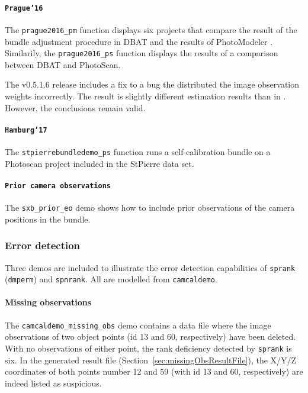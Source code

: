 \documentclass{article}
\begin{document}
\paragraph{\texttt{Prague'16}}
\label{sec:orgfb80e75}
The \texttt{prague2016\_pm} function displays six projects that
compare the result of the bundle adjustment procedure in DBAT and the
results of PhotoModeler \citep{Borlin2016:External}. Similarily, the
\texttt{prague2016\_ps} function displays the results of a comparison
between DBAT and PhotoScan.

The v0.5.1.6 release includes a fix to a bug the distributed the image
observation weights incorrectly. The result is slightly different
estimation results than in \citet{Borlin2016:External}. However, the
conclusions remain valid.

\paragraph{\texttt{Hamburg'17}}
\label{sec:orgd3c4b10}
The \texttt{stpierrebundledemo\_ps} function runs a self-calibration
bundle on a Photoscan project included in the StPierre data set.

\paragraph{\texttt{Prior camera observations}}
\label{sec:orgadeb1dc}
The \texttt{sxb\_prior\_eo} demo shows how to include prior
observations of the camera positions in the bundle.

\subsubsection{Error detection}
\label{sec:org99fbd6b}

Three demos are included to illustrate the error detection
capabilities of \texttt{sprank} (\texttt{dmperm}) and
\texttt{spnrank}. All are modelled from \texttt{camcaldemo}.

\paragraph{Missing observations}
\label{sec:orgada4fb1}

The \texttt{camcaldemo\_missing\_obs} demo contains a data file where the image
observations of two object points (id 13 and 60, respectively) have
been deleted. With no observations of either point, the rank
deficiency detected by \texttt{sprank} is six. In the generated result file
(Section~\ref{sec:missingObsResultFile}), the X/Y/Z coordinates
of both points number 12 and 59 (with id 13 and 60, respectively) are
indeed listed as suspicious.
\end{document}

